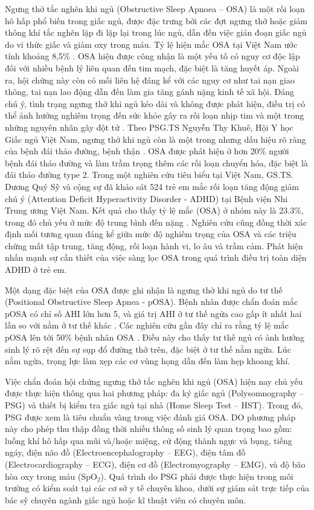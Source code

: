 Ngưng thở tắc nghẽn khi ngủ (Obstructive Sleep Apnoea – OSA) là một rối loạn hô hấp phổ biến trong giấc ngủ, được đặc trưng bởi các đợt ngưng thở hoặc giảm thông khí tắc nghẽn lặp đi lặp lại trong lúc ngủ, dẫn đến việc gián đoạn giấc ngủ do vi thức giấc và giảm oxy trong máu.  Tỷ lệ hiện mắc OSA tại Việt Nam ước tính khoảng 8,5\% \cite{nguoimacOSA_VN}. OSA hiện được công nhận là một yếu tố có nguy cơ độc lập đối với nhiều bệnh lý liên quan đến tim mạch, đặc biệt là tăng huyết áp. Ngoài ra, hội chứng này còn có mối liên hệ đáng kể với các nguy cơ như tai nạn giao thông, tai nạn lao động dẫn đến làm gia tăng gánh nặng kinh tế xã hội\cite{osa_bike}\cite{Marin2005}\cite{drive_osa}. Đáng chú ý, tình trạng ngưng thở khi ngủ kéo dài và không được phát hiện, điều trị có thể ảnh hưởng nghiêm trọng đến sức khỏe gây ra rối loạn nhịp tim và một trong những nguyên nhân gây đột tử \cite{sumarry_osa}. Theo PSG.TS Nguyễn Thy Khuê, Hội Y học Giấc ngủ Việt Nam, ngưng thở khi ngủ còn là một trong nhưng dấu hiệu rõ ràng của bệnh đái tháo đường, bệnh thận \cite{bsThyKhue}. OSA được phát hiện ở hơn 20\% người bệnh đái tháo đường và làm trầm trọng thêm các rối loạn chuyển hóa, đặc biệt là đái tháo đường type 2. Trong một nghiên cứu tiêu biểu tại Việt Nam, GS.TS. Dương Quý Sỹ và cộng sự đã khảo sát 524 trẻ em mắc rối loạn tăng động giảm chú ý (Attention Deficit Hyperactivity Disorder - ADHD) tại Bệnh viện Nhi Trung ương Việt Nam. Kết quả cho thấy tỷ lệ mắc (OSA) ở nhóm này là 23.3\%, trong đó chủ yếu ở mức độ trung bình đến nặng \cite{ThaySUCHildren}. Nghiên cứu cũng đồng thời xác định mối tương quan đáng kể giữa mức độ nghiêm trọng của OSA và các triệu chứng mất tập trung, tăng động, rối loạn hành vi, lo âu và trầm cảm. Phát hiện nhấn mạnh sự cần thiết của việc sàng lọc OSA trong quá trình điều trị toàn diện ADHD ở trẻ em. 

Một dạng đặc biệt của OSA được ghi nhận là ngưng thở khi ngủ do tư thế (Positional Obstructive Sleep Apnea - pOSA). Bệnh nhân được chẩn đoán mắc pOSA có chỉ số AHI lớn hơn 5, và giá trị AHI ở tư thế ngửa cao gấp ít nhất hai lần so với nằm ở tư thế khác \cite{heinzer2018}. Các nghiên cứu gần đây chỉ ra rằng tỷ lệ mắc pOSA lên tới 50\% bệnh nhân OSA \cite{sabil2020}. Điều này cho thấy tư thế ngủ có ảnh hưởng sinh lý rõ rệt đến sự sụp đổ đường thở trên, đặc biệt ở tư thế nằm ngữa. Lúc nằm ngửa, trọng lực làm xẹp các cơ vùng họng dẫn đến làm hẹp khoang khí.

Việc chẩn đoán hội chứng ngưng thở tắc nghẽn khi ngủ (OSA) hiện nay chủ yếu được thực hiện thông qua hai phương pháp: đa ký giấc ngủ (Polysomnography – PSG) và thiết bị kiểm tra giấc ngủ tại nhà (Home Sleep Test – HST). Trong đó, PSG được xem là tiêu chuẩn vàng trong việc đánh giá OSA. DO phương pháp này cho phép thu thập đồng thời nhiều thông số sinh lý quan trọng bao gồm: luồng khí hô hấp qua mũi và/hoặc miệng, cử động thành ngực và bụng, tiếng ngáy, điện não đồ (Electroencephalography – EEG), điện tâm đồ (Electrocardiography – ECG), điện cơ đồ (Electromyography – EMG), và độ bão hòa oxy trong máu (SpO$_2$). Quá trình do PSG phải được thực hiện trong môi trường có kiểm soát tại các cơ sở y tế chuyên khoa, dưới sự giám sát trực tiếp của bác sỹ chuyên ngành giấc ngủ hoặc kĩ thuật viên có chuyên môn\cite{psg_paper}\cite{kushida2005psg}. 

